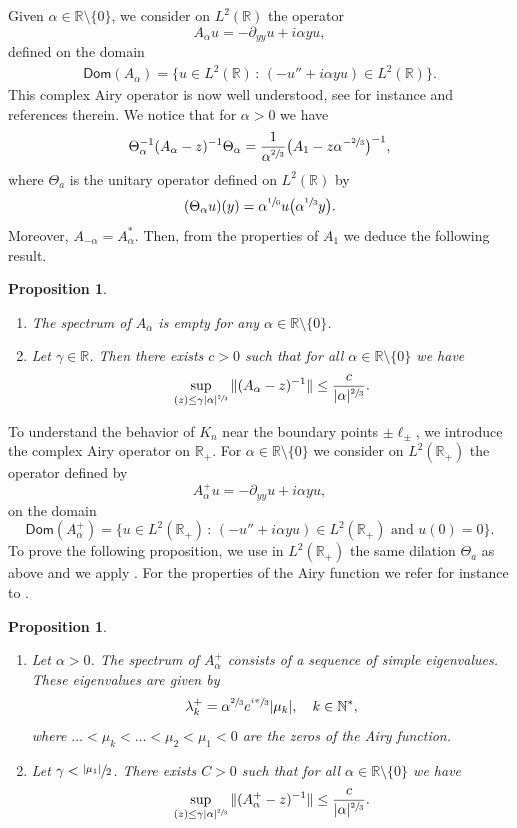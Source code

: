 \documentclass[11pt]{article}
\newcommand{\skpt}{\smallskip}
\numberwithin{equation}{section}
\theoremstyle{plain}
\newtheorem{proposition}[theorem]{Proposition}
\theoremstyle{definition}
\newcommand{\abs}[1]{\vert #1\vert}
\newcommand{\nr}[1]{\Vert #1\Vert}
\newcommand{\set}[1]{\{ #1\}}
\newcommand{\bset}[1]{\bigl\{ #1\bigr\}}
\newcommand{\inv}{^{-1}}
\newcommand{\1}{\mathds 1}
\newcommand{\st}{\,:\,}
\let\Re\relax
\DeclareMathOperator{\Re}{\mathsf{Re}\mkern2mu}
\newcommand{\Dom}{\mathsf{Dom}}
\newcommand{\R}{\mathbb{R}}
\newcommand{\N}{\mathbb{N}}
\let\a\alpha
\let\g\gamma
\let\Th\Theta
\let\l\lambda
\let\m\mu
\begin{document}
Given $\a \in \R \setminus \set 0$, we consider on $L^2(\R)$ the operator
\begin{equation} \label{def-Aa}
A_\a u = -\partial_{yy} u + i \a y u,
\end{equation}
defined on the domain
\begin{align*}
\Dom(A_\a) = \set{u \in L^2(\R) \st (-u'' + i \a y u) \in L^2(\R)}.
\end{align*}
This complex Airy operator is now well understood, see for instance \cite{Helffer11,KrejcirikSie15} and references therein. We notice that for $\a > 0$ we have
\[
\Th_\a \inv (A_\a - z)\inv \Th_\a = \frac 1 {\a^{\sfrac 23}} \bigl(A_1 - z \a^{-\sfrac 23} \bigr) \inv,
\]
where $\Th_a$ is the unitary operator defined on $L^2(\R)$ by
\[
(\Th_\a u)(y) = \a^{\sfrac 16} u \bigl(\a^{\sfrac 13} y \bigr).
\]
Moreover, $A_{-\a} = A_\a^*$. Then, from the properties of $A_{1}$ we deduce the following result.

\skpt
\begin{proposition}
\begin{enumerate}
\item The spectrum of $A_\a$ is empty for any $\a \in \R\setminus \set 0$.
\item Let $\gamma \in \R$. Then there exists $c > 0$ such that for all $\a \in \R \setminus \set 0$ we have
\[
\sup_{\Re(z) \leq \g \abs \a^{\sfrac 2 3}} \nr{(A_\a -z)\inv} \leq \frac c {\abs \a^{\sfrac 23}}.
\]
\end{enumerate} \label{prop-Airy-R}
\end{proposition}

To understand the behavior of $K_n$ near the boundary points $\pm \ell_\pm$, we introduce the complex Airy operator on $\R_+$. For $\a \in \R \setminus \set 0$ we consider on $L^2(\R_+)$ the operator defined by
\[
A_\a^+ u = -\partial_{yy} u + i \a y u,
\]
on the domain
\[
\Dom(A_\a^+) = \bset{u \in L^2(\R_+) \st (-u'' + i \a y u) \in L^2(\R_+) \text{ and } u(0) = 0}.
\]
To prove the following proposition, we use in $L^2(\R_+)$ the same dilation $\Th_a$ as above and we apply \cite[Lemma 5.1]{Helffer11}. For the properties of the Airy function we refer for instance to \cite{ValleeSoares}.

\skpt
\begin{proposition}
\begin{enumerate}
\item Let $\a > 0$. The spectrum of $A_\a^+$ consists of a sequence of simple eigenvalues. These eigenvalues are given by
\[
\l_k^+ = \a^{\sfrac 23} e^{\sfrac {i\pi}3} \abs {\m_k}, \quad k \in \N^*,
\]
where $\dots < \mu_k < \dots < \mu_2 < \mu_1 < 0$ are the zeros of the Airy function.
\item Let $\gamma < \sfrac {\abs {\mu_1}} 2$. There exists $C > 0$ such that for all $\a \in \R \setminus \set 0$ we have
\[
\sup_{\Re(z) \leq \g \abs \a^{\sfrac 2 3}} \nr{(A_\a^+ -z)\inv} \leq \frac c {\abs \a^{\sfrac 23}}.
\]
\end{enumerate}\label{prop-Airy-R+}
\end{proposition}
\end{document}
